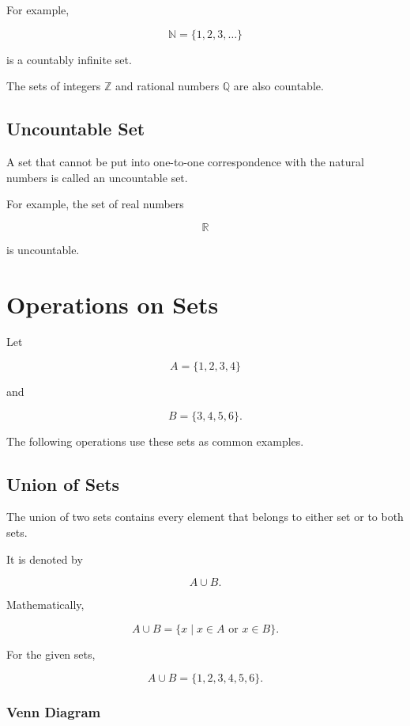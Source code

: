 \documentclass[12pt,a4paper]{article}
\begin{document}
For example,

\[
\mathbb{N}=\{1,2,3,\ldots\}
\]

is a countably infinite set.

The sets of integers $\mathbb{Z}$ and rational numbers $\mathbb{Q}$
are also countable.


\subsection{Uncountable Set}

A set that cannot be put into one-to-one correspondence with the natural
numbers is called an uncountable set.

For example, the set of real numbers

\[
\mathbb{R}
\]

is uncountable.


\section{Operations on Sets}

Let

\[
A=\{1,2,3,4\}
\]

and

\[
B=\{3,4,5,6\}.
\]

The following operations use these sets as common examples.


\subsection{Union of Sets}

The union of two sets contains every element that belongs to either set
or to both sets.

It is denoted by

\[
A\cup B.
\]

Mathematically,

\[
A\cup B
=
\{x\mid x\in A\text{ or }x\in B\}.
\]

For the given sets,

\[
A\cup B=\{1,2,3,4,5,6\}.
\]

\subsubsection*{Venn Diagram}
\end{document}
